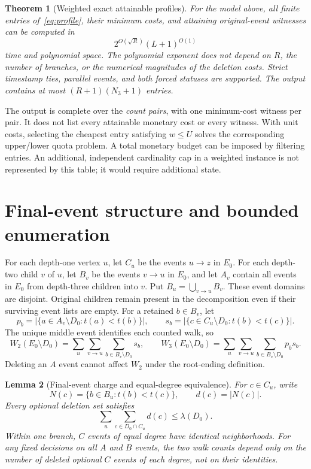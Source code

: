 \documentclass[11pt]{article}
\newtheorem{theorem}{Theorem}[section]
\newtheorem{lemma}[theorem]{Lemma}
\theoremstyle{remark}
\begin{document}
\begin{theorem}[Weighted exact attainable profiles]\label{thm:main}
For the model above, all finite entries of~\eqref{eq:profile}, their minimum
costs, and attaining original-event witnesses can be computed in
\[
 2^{O(\sqrt R)}(L+1)^{O(1)}
\]
time and polynomial space. The polynomial exponent does not depend on $R$,
the number of branches, or the numerical magnitudes of the deletion costs.
Strict timestamp ties, parallel events, and both forced statuses are supported.
The output contains at most $(R+1)(N_3+1)$ entries.
\end{theorem}

The output is complete over the \emph{count pairs}, with one minimum-cost
witness per pair. It does not list every attainable monetary cost or every
witness. With unit costs, selecting the cheapest entry satisfying $w\le U$
solves the corresponding upper/lower quota problem. A total monetary budget can be imposed
by filtering entries. An additional, independent cardinality cap in a weighted
instance is not represented by this table; it would require additional state.

\section{Final-event structure and bounded enumeration}\label{sec:structure}

For each depth-one vertex $u$, let $C_u$ be the events $u\to z$ in $E_0$.
For each depth-two child $v$ of $u$, let $B_v$ be the events $v\to u$ in $E_0$,
and let $A_v$ contain all events in $E_0$ from depth-three children into $v$. Put
$B_u=\bigcup_{v\to u}B_v$. These event domains are disjoint. Original children
remain present in the decomposition even if their surviving event lists are
empty. For a retained $b\in B_v$, let
\[
 p_b=|\{a\in A_v\setminus D_0:t(a)<t(b)\}|,\qquad
 s_b=|\{c\in C_u\setminus D_0:t(b)<t(c)\}|.
\]
The unique middle event identifies each counted walk, so
\begin{equation}
 W_2(E_0\setminus D_0)=\sum_u\sum_{v\to u}\sum_{b\in B_v\setminus D_0}s_b,
 \qquad
 W_3(E_0\setminus D_0)=\sum_u\sum_{v\to u}\sum_{b\in B_v\setminus D_0}p_bs_b.
 \label{eq:identities}
\end{equation}
Deleting an $A$ event cannot affect $W_2$ under the root-ending definition.

\begin{lemma}[Final-event charge and equal-degree equivalence]\label{lem:c}
For $c\in C_u$, write
\[
 N(c)=\{b\in B_u:t(b)<t(c)\},\qquad d(c)=|N(c)|.
\]
Every optional deletion set satisfies
\begin{equation}
 \sum_u\sum_{c\in D_0\cap C_u}d(c)\le\lambda(D_0).
 \label{eq:ccharge}
\end{equation}
Within one branch, $C$ events of equal degree have identical neighborhoods.
For any fixed decisions on all $A$ and $B$ events, the two walk counts depend
only on the number of deleted optional $C$ events of each degree, not on their
identities.
\end{lemma}
\end{document}
